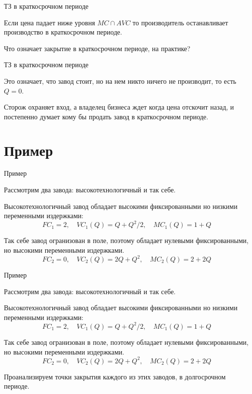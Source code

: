 \documentclass{beamer}
\begin{document}
\begin{frame}{ТЗ в краткосрочном периоде}

\begin{lemma}
Если цена падает ниже уровня $MC \cap AVC$ то производитель останавливает производство в краткосрочном периоде.
\end{lemma}

Что означает закрытие в краткосрочном периоде, на практике?

\end{frame}

\begin{frame}{ТЗ в краткосрочном периоде}

Это означает, что завод стоит, но на нем никто ничего не производит, то есть $Q=0$. 

Сторож охраняет вход, а владелец бизнеса ждет когда цена отскочит назад, и постепенно думает кому бы продать завод в краткосрочном периоде.

\end{frame}

\section{Пример}

\begin{frame}{Пример}

Рассмотрим два завода: высокотехнологичный и так себе. 

Высокотехнологичный завод обладает высокими фиксированными но низкими переменными издержками:
$$FC_1 = 2, \quad VC_1(Q) = Q + Q^2/2, \quad MC_1(Q) = 1 + Q$$

Так себе завод огранизован в поле, поэтому обладает нулевыми фиксированными, но высокими переменными издержками.
$$FC_2 = 0, \quad VC_2(Q) = 2Q + Q^2, \quad MC_2(Q) = 2 + 2Q$$

\end{frame}

\begin{frame}{Пример}

Рассмотрим два завода: высокотехнологичный и так себе. 

Высокотехнологичный завод обладает высокими фиксированными но низкими переменными издержками:
$$FC_1 = 2, \quad VC_1(Q) = Q + Q^2/2, \quad MC_1(Q) = 1 + Q$$

Так себе завод огранизован в поле, поэтому обладает нулевыми фиксированными, но высокими переменными издержками.
$$FC_2 = 0, \quad VC_2(Q) = 2Q + Q^2, \quad MC_2(Q) = 2 + 2Q$$

Проанализируем точки закрытия каждого из этих заводов, в долгосрочном периоде.

\end{frame}
\end{document}
